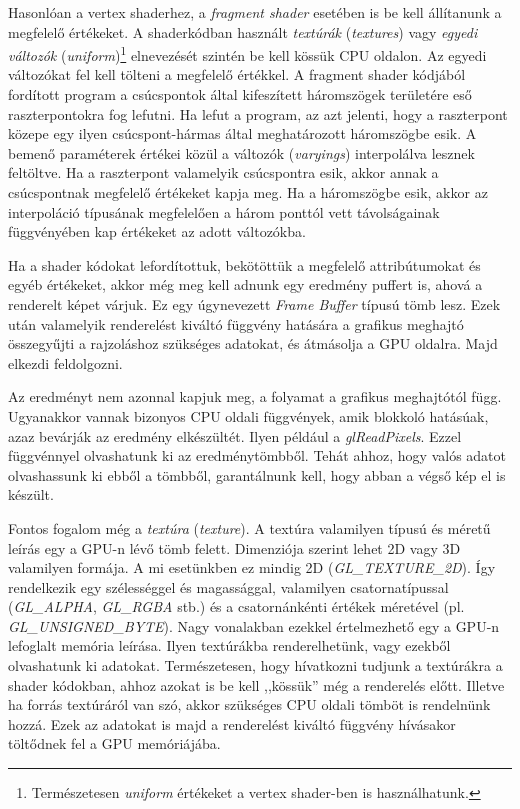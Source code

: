 \documentclass[12pt]{report}
\theoremstyle{definition}
\newcommand{\inenglish}[1]{\textsl{#1}}
\newcommand{\func}[1]{{\textsl{#1}}}
\begin{document}
Hasonlóan a vertex shaderhez, a \emph{fragment shader} esetében is be kell
állítanunk a megfelelő értékeket. A shaderkódban használt \emph{textúrák}
(\inenglish{textures}) vagy \emph{egyedi változók}
(\inenglish{uniform})\footnote{Természetesen \func{uniform} értékeket a vertex
shader-ben is használhatunk.} elnevezését szintén be kell kössük CPU oldalon.
Az egyedi változókat fel kell tölteni a megfelelő értékkel. A fragment shader
kódjából fordított program a csúcspontok által kifeszített háromszögek
területére eső raszterpontokra fog lefutni. Ha lefut a program, az azt
jelenti, hogy a raszterpont közepe egy ilyen csúcspont-hármas által meghatározott
háromszögbe esik. A bemenő paraméterek értékei közül a változók
(\inenglish{varyings}) interpolálva lesznek feltöltve. Ha a raszterpont
valamelyik csúcspontra esik, akkor annak a csúcspontnak megfelelő értékeket
kapja meg. Ha a háromszögbe esik, akkor az interpoláció típusának megfelelően a
három ponttól vett távolságainak függvényében kap értékeket az adott
változókba.

Ha a shader kódokat lefordítottuk, bekötöttük a megfelelő attribútumokat és
egyéb értékeket, akkor még meg kell adnunk egy eredmény puffert is, ahová a
renderelt képet várjuk. Ez egy úgynevezett \func{Frame Buffer} típusú tömb
lesz. Ezek után valamelyik renderelést kiváltó függvény hatására a grafikus
meghajtó összegyűjti a rajzoláshoz szükséges adatokat, és átmásolja a GPU
oldalra. Majd elkezdi feldolgozni.

Az eredményt nem azonnal kapjuk meg, a folyamat a grafikus meghajtótól függ.
Ugyanakkor vannak bizonyos CPU oldali függvények, amik blokkoló hatásúak, azaz
bevárják az eredmény elkészültét. Ilyen például a \func{glReadPixels}. Ezzel
függvénnyel olvashatunk ki az eredménytömbből. Tehát ahhoz, hogy valós adatot
olvashassunk ki ebből a tömbből, garantálnunk kell, hogy abban a végső kép el
is készült.

Fontos fogalom még a \emph{textúra} (\inenglish{texture}). A textúra valamilyen
típusú és méretű leírás egy a GPU-n lévő tömb felett. Dimenziója szerint lehet
2D vagy 3D valamilyen formája. A mi esetünkben ez mindig 2D
(\func{GL\_TEXTURE\_2D}). Így rendelkezik egy szélességgel és magassággal,
valamilyen csatornatípussal (\func{GL\_ALPHA}, \func{GL\_RGBA} stb.) és a
csatornánkénti értékek méretével (pl. \func{GL\_UNSIGNED\_BYTE}). Nagy
vonalakban ezekkel értelmezhető egy a GPU-n lefoglalt memória leírása. Ilyen
textúrákba renderelhetünk, vagy ezekből olvashatunk ki adatokat. Természetesen,
hogy hívatkozni tudjunk a textúrákra a shader kódokban, ahhoz azokat is be kell
,,kössük'' még a renderelés előtt. Illetve ha forrás textúráról van szó, akkor
szükséges CPU oldali tömböt is rendelnünk hozzá. Ezek az adatokat is majd a
renderelést kiváltó függvény hívásakor töltődnek fel a GPU memóriájába.
\end{document}
